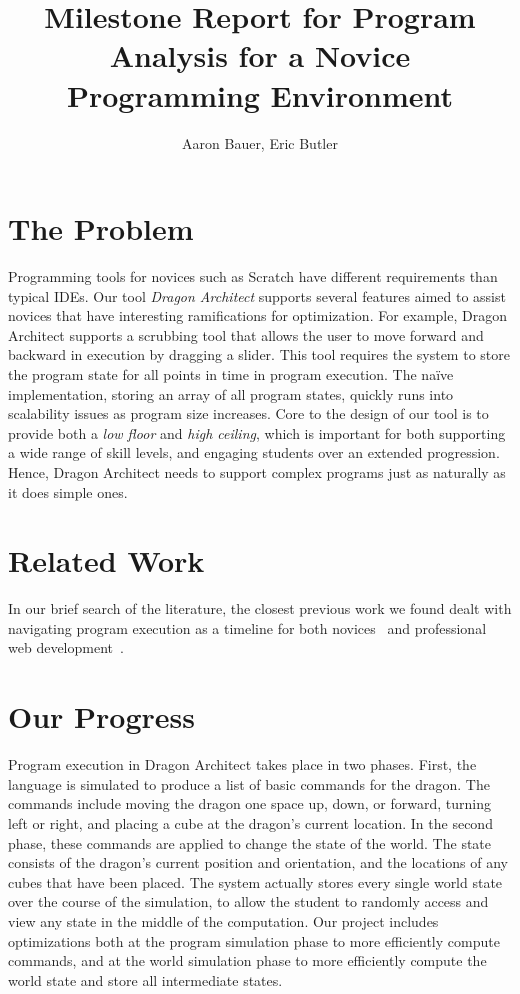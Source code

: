 \documentclass{sig-alternate}
\begin{document}
\title{Milestone Report for Program Analysis for a Novice Programming Environment}
\author{Aaron Bauer, Eric Butler}
\maketitle{}

\section*{The Problem}
Programming tools for novices such as Scratch have different requirements than typical IDEs. Our tool \emph{Dragon Architect} supports several features aimed to assist novices that have interesting ramifications for optimization. For example, Dragon Architect supports a scrubbing tool that allows the user to move forward and backward in execution by dragging a slider. This tool requires the system to store the program state for all points in time in program execution. The na\"{i}ve implementation, storing an array of all program states, quickly runs into scalability issues as program size increases. Core to the design of our tool is to provide both a \emph{low floor} and \emph{high ceiling}, which is important for both supporting a wide range of skill levels, and engaging students over an extended progression. Hence, Dragon Architect needs to support complex programs just as naturally as it does simple ones. 

\section*{Related Work}
In our brief search of the literature, the closest previous work we found dealt with navigating program execution as a timeline for both novices~\cite{ko2004designing} and professional web development~\cite{burg2013interactive}.

\section*{Our Progress}

Program execution in Dragon Architect takes place in two phases. First, the language is simulated to produce a list of basic commands for the dragon. The commands include moving the dragon one space up, down, or forward, turning left or right, and placing a cube at the dragon's current location. In the second phase, these commands are applied to change the state of the world. The state consists of the dragon's current position and orientation, and the locations of any cubes that have been placed. The system actually stores every single world state over the course of the simulation, to allow the student to randomly access and view any state in the middle of the computation. Our project includes optimizations both at the program simulation phase to more efficiently compute commands, and at the world simulation phase to more efficiently compute the world state and store all intermediate states.
\end{document}

